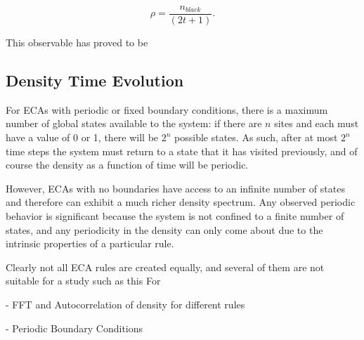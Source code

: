 \begin{equation}
    \rho = \frac{n_{black}}{(2t+1)}.
\end{equation}

This observable has proved to be 


\subsection{Density Time Evolution}
For ECAs with periodic or fixed boundary conditions, there is a
maximum number of global states available to the system: if there are
$n$ sites and each must have a value of 0 or 1, there will be $2^n$
possible states.
As such, after at most $2^n$ time steps the system must return to
a state that it has visited previously, and of course the density as a
function of time will be periodic.

However, ECAs with no boundaries have access to an infinite number of
states and therefore can exhibit a much richer density spectrum.
Any observed periodic behavior is significant because the system is
not confined to a finite number of states, and any periodicity in the
density can only come about due to the intrinsic properties of a
particular rule.

Clearly not all ECA rules are created equally, and several of them are
not suitable for a study such as this 
For 

 - FFT and Autocorrelation of density for different rules

 - Periodic Boundary Conditions
